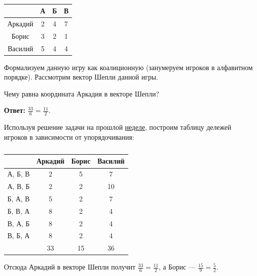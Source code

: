 	\begin{table}[h]
		\label{sheply:table1}
		\caption{}
		\centering
		\begin{tabular}{|c|c|c|c|}
			\hline & А & Б & В \\ 	
			\hline Аркадий & 2 & 4 & 7 \\ 
			\hline Борис & 3 & 2 & 1 \\ 
			\hline Василий & 5 & 4 & 4 \\ 
			\hline 
		\end{tabular} 
	\end{table}

	Формализуем данную игру как коалиционную (занумеруем игроков в алфавитном порядке). Рассмотрим вектор Шепли данной игры.
	
	Чему равна координата Аркадия в векторе Шепли?
	
	\textbf{Ответ:} $\frac{33}{6} = \frac{11}{2}$.
	
	\solution
	Используя решение задачи на прошлой \hyperref[arkadiy:sol1]{неделе}, построим таблицу дележей игроков в зависимости от упорядочивания:
	\begin{table}[h]
		\label{sheply:table2}
		\caption{}
		\centering
	\begin{tabular}{|c|c|c|c|}
		\hline 
		& Аркадий & Борис & Василий \\ 
		\hline 
		А, Б, В & 2 & 5 & 7 \\ 
		\hline 
		А, В, Б & 2 & 2 & 10 \\ 
		\hline 
		Б, А, В & 5 & 2 & 7 \\ 
		\hline 
		Б, В, А & 8 & 2 & 4 \\ 
		\hline 
		В, А, Б & 8 & 2 & 4 \\ 
		\hline 
		В, Б, А & 8 & 2 & 4 \\ 
		\hline 
		& 33 & 15 & 36 \\ 
		\hline 
	\end{tabular}
	\end{table}

	Отсюда Аркадий в векторе Шепли получит $\frac{33}{6} = \frac{11}{2}$, а Борис --- $\frac{15}{9}=\frac{5}{2}$.